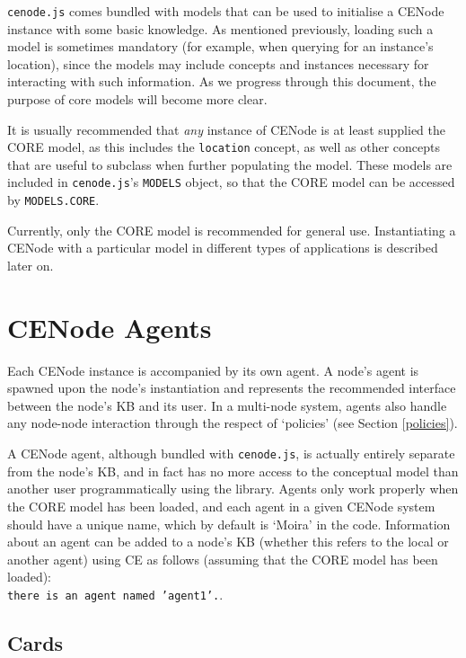 \documentclass{scrartcl}
\begin{document}
\texttt{cenode.js} comes bundled with models that can be used to initialise a CENode instance with some basic knowledge. As mentioned previously, loading such a model is sometimes mandatory (for example, when querying for an instance's location), since the models may include concepts and instances necessary for interacting with such information. As we progress through this document, the purpose of core models will become more clear.

It is usually recommended that \textit{any} instance of CENode is at least supplied the CORE model, as this includes the \texttt{location} concept, as well as other concepts that are useful to subclass when further populating the model. These models are included in \texttt{cenode.js}'s \texttt{MODELS} object, so that the CORE model can be accessed by \texttt{MODELS.CORE}. 

Currently, only the CORE model is recommended for general use. Instantiating a CENode with a particular model in different types of applications is described later on.



\section{CENode Agents}
Each CENode instance is accompanied by its own agent. A node's agent is spawned upon the node's instantiation and represents the recommended interface between the node's KB and its user. In a multi-node system, agents also handle any node-node interaction through the respect of `policies' (see Section \ref{policies}).

A CENode agent, although bundled with \texttt{cenode.js}, is actually entirely separate from the node's KB, and in fact has no more access to the conceptual model than another user programmatically using the library. Agents only work properly when the CORE model has been loaded, and each agent in a given CENode system should have a unique name, which by default is `Moira' in the code. Information about an agent can be added to a node's KB (whether this refers to the local or another agent) using CE as follows (assuming that the CORE model has been loaded):\\
\texttt{there is an agent named 'agent1'.}.

\subsection{Cards}
\end{document}

